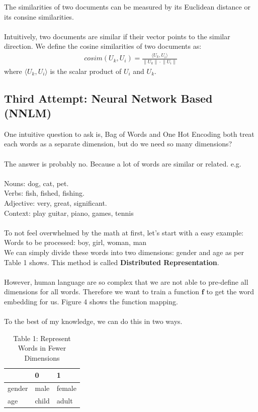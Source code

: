 \documentclass[paper=a4, fontsize=12pt]{scrartcl}
\begin{document}
The similarities of two documents can be measured by its Euclidean distance or its consine similarities. \\\\
Intuitively, two documents are similar if their vector points to the similar direction. We define the cosine similarities of two documents as: \\
\begin{align}
cosim(U_k, U_i) = \frac{\langle U_k, U_i \rangle}{\lVert U_k \rVert \cdot \lVert U_i \rVert}
\end{align}
where $\langle U_k, U_i \rangle$ is the scalar product of $U_i$ and $U_k$. 

\subsection{Third Attempt: Neural Network Based (NNLM)}
One intuitive question to ask is, Bag of Words and One Hot Encoding both treat each words as a separate dimension, but do we need so many dimensions?\\\\
The answer is probably no. Because a lot of words are similar or related. e.g. \\\\
Nouns: dog, cat, pet.\\
Verbs: fish, fished, fishing. \\
Adjective: very, great, significant. \\
Context: play {guitar, piano, games, tennis}\\\\
To not feel overwhelmed by the math at first, let's start with a easy example: \\
Words to be processed: boy, girl, woman, man \\
We can simply divide these words into two dimensions: gender and age as per Table 1 shows. This method is called \textbf{Distributed Representation}.\\\\
However, human language are so complex that we are not able to pre-define all dimensions for all words. Therefore we want to train a function $\mathbf{f}$ to get the word embedding for us. Figure 4 shows the function mapping. \\\\
To the best of my knowledge, we can do this in two ways. 
\begin{table}[]
\begin{tabular}{|l|l|l|}
\hline
       & 0     & 1      \\ \hline
gender & male  & female \\ \hline
age    & child & adult  \\ \hline
\end{tabular}
\caption{Table 1: Represent Words in Fewer Dimensions}
\end{table}
\end{document}
